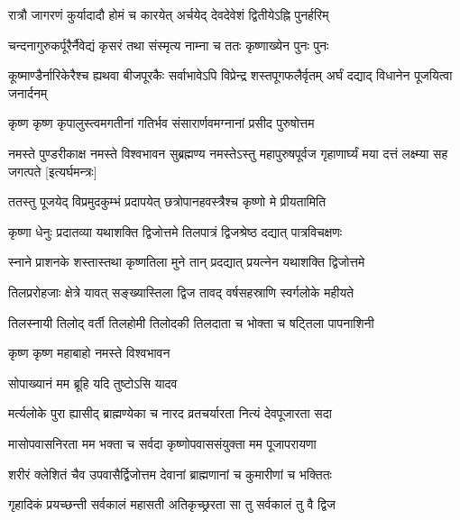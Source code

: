 \twolineshloka
{रात्रौ जागरणं कुर्यादादौ होमं च कारयेत्}
{अर्चयेद् देवदेवेशं द्वितीयेऽह्नि पुनर्हरिम्}%

\twolineshloka
{चन्दनागुरुकर्पूरैर्नैवेद्यं कृसरं तथा}
{संस्मृत्य नाम्ना च ततः कृष्णाख्येन पुनः पुनः}%

\threelineshloka
{कूष्माण्डैर्नारिकेरैश्च ह्यथवा बीजपूरकैः}
{सर्वाभावेऽपि विप्रेन्द्र शस्तपूगफलैर्वृतम्}
{अर्घं दद्याद् विधानेन पूजयित्वा जनार्दनम्}%

\twolineshloka
{कृष्ण कृष्ण कृपालुस्त्वमगतीनां गतिर्भव}
{संसारार्णवमग्नानां प्रसीद पुरुषोत्तम}%

\threelineshloka
{नमस्ते पुण्डरीकाक्ष नमस्ते विश्वभावन}
{सुब्रह्मण्य नमस्तेऽस्तु महापुरुषपूर्वज}
{गृहाणार्घ्यं मया दत्तं लक्ष्म्या सह जगत्पते}%
[इत्यर्घमन्त्रः]

\twolineshloka
{ततस्तु पूजयेद् विप्रमुदकुम्भं प्रदापयेत्}
{छत्रोपानहवस्त्रैश्च कृष्णो मे प्रीयतामिति}%

\twolineshloka
{कृष्णा धेनुः प्रदातव्या यथाशक्ति द्विजोत्तमे}
{तिलपात्रं द्विजश्रेष्ठ दद्यात् पात्रविचक्षणः}%

\twolineshloka
{स्नाने प्राशनके शस्तास्तथा कृष्णतिला मुने}
{तान् प्रदद्यात् प्रयत्नेन यथाशक्ति द्विजोत्तमे}

\twolineshloka
{तिलप्ररोहजाः क्षेत्रे यावत् सङ्ख्यास्तिला द्विज}%
{तावद् वर्षसहस्राणि स्वर्गलोके महीयते}

\twolineshloka
{तिलस्नायी तिलोद् वर्ती तिलहोमी तिलोदकी}%
{तिलदाता च भोक्ता च षट्तिला पापनाशिनी}


\onelineshloka
{कृष्ण कृष्ण महाबाहो नमस्ते विश्वभावन}%

{सोपाख्यानं मम ब्रूहि यदि तुष्टोऽसि यादव}



\twolineshloka
{मर्त्यलोके पुरा ह्यासीद् ब्राह्मण्येका च नारद}
{व्रतचर्यारता नित्यं देवपूजारता सदा}%

\twolineshloka
{मासोपवासनिरता मम भक्ता च सर्वदा}
{कृष्णोपवाससंयुक्ता मम पूजापरायणा}%

\twolineshloka
{शरीरं क्लेशितं चैव उपवासैर्द्विजोत्तम}
{देवानां ब्राह्मणानां च कुमारीणां च भक्तितः}%

\twolineshloka
{गृहादिकं प्रयच्छन्ती सर्वकालं महासती}
{अतिकृच्छ्ररता सा तु सर्वकालं तु वै द्विज}%

